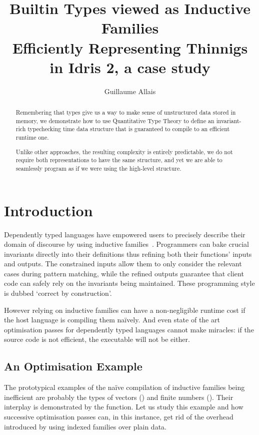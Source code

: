 \documentclass{article}
\newcommand{\idris}{Idris 2}
\begin{document}
\title{Builtin Types viewed as Inductive Families \\
{\large Efficiently Representing Thinnigs in \idris, a case study}}
\author{Guillaume Allais}

\maketitle

\begin{abstract}
  Remembering that types give us a way to make sense of unstructured data stored
  in memory, we demonstrate how to use Quantitative Type Theory to define an
  invariant-rich typechecking time data structure that is guaranteed to compile
  to an efficient runtime one.

  Unlike other approaches, the resulting complexity is entirely predictable, we do
  not require both representations to have the same structure, and yet we are able
  to seamlessly program as if we were using the high-level structure.
\end{abstract}

\section{Introduction}

Dependently typed languages have empowered users to precisely describe their domain
of discourse by using inductive families~\cite{DBLP:journals/fac/Dybjer94}.
%
Programmers can bake crucial invariants directly into their definitions thus refining
both their functions' inputs and outputs.
%
The constrained inputs allow them to only consider the relevant cases during pattern
matching, while the refined outputs guarantee that client code can safely rely on the
invariants being maintained.
%
These programming style is dubbed `correct by construction'.

However relying on inductive families can have a non-negligible runtime cost if
the host language is compiling them naïvely. And even state of the art optimisation
passes for dependently typed languages cannot make miracles: if the source code is
not efficient, the executable will not be either.

\subsection{An Optimisation Example}

The prototypical examples of the naïve compilation of inductive families being
inefficient are probably the types of vectors ()
and finite numbers ().
%
Their interplay is demonstrated by the  function.
Let us study this example and how successive optimisation passes can, in this
instance, get rid of the overhead introduced by using indexed families over
plain data.
\end{document}
